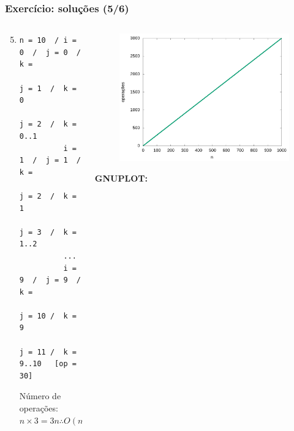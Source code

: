 \documentclass[aspectratio=169]{beamer}
\begin{document}
\begin{frame}[fragile]\frametitle{Exercício: soluções (5/6)}
\begin{columns}[T]
\begin{column}{0.5\linewidth}
\begin{enumerate}
	\setcounter{enumi}{4}
	\item {\scriptsize}
{\tiny
\begin{verbatim}
n = 10  / i = 0  /  j = 0  /  k = 
                    j = 1  /  k = 0
                    j = 2  /  k = 0..1
          i = 1  /  j = 1  /  k = 
                    j = 2  /  k = 1
                    j = 3  /  k = 1..2
          ...
          i = 9  /  j = 9  /  k = 
                    j = 10 /  k = 9
                    j = 11 /  k = 9..10   [op = 30]
\end{verbatim}
Número de operações: $n \times 3 = 3n \therefore O(n)$
}
\end{enumerate}
\end{column}
\begin{column}{0.5\linewidth}
\begin{figure}[h]
	\centering
	\includegraphics[height=0.5\paperheight]{contagem/contagem05.jpg}
\end{figure}
{\fontsize{0}{4}\selectfont{}\textbf{GNUPLOT:}

}
\end{column}
\end{columns}
\end{frame}
\end{document}
